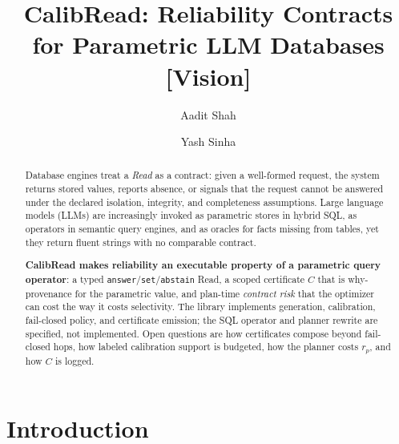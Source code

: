 \documentclass[sigconf, nonacm]{acmart}
\newcommand{\cbras}{\texttt{answer}/\allowbreak\texttt{set}/\allowbreak\texttt{abstain}}
\begin{document}
\title{CalibRead: Reliability Contracts for Parametric LLM Databases [Vision]}
\renewcommand\vldbtitle{CalibRead: Reliability Contracts for Parametric LLM Databases [Vision]}

\author{Aadit Shah}

\author{Yash Sinha}

\begin{abstract}
Database engines treat a \emph{Read} as a contract: given a well-formed request, the system returns stored values, reports absence, or signals that the request cannot be answered under the declared isolation, integrity, and completeness assumptions. Large language models (LLMs) are increasingly invoked as parametric stores in hybrid SQL, as operators in semantic query engines, and as oracles for facts missing from tables, yet they return fluent strings with no comparable contract.

\textbf{CalibRead makes reliability an executable property of a parametric query operator}: a typed \cbras{} Read, a scoped certificate $C$ that is why-provenance for the parametric value, and plan-time \emph{contract risk} that the optimizer can cost the way it costs selectivity. The library implements generation, calibration, fail-closed policy, and certificate emission; the SQL operator and planner rewrite are specified, not implemented. Open questions are how certificates compose beyond fail-closed hops, how labeled calibration support is budgeted, how the planner costs $r_p$, and how $C$ is logged.
\end{abstract}

\maketitle

\vldbtopmatter

\section{Introduction}
\end{document}
